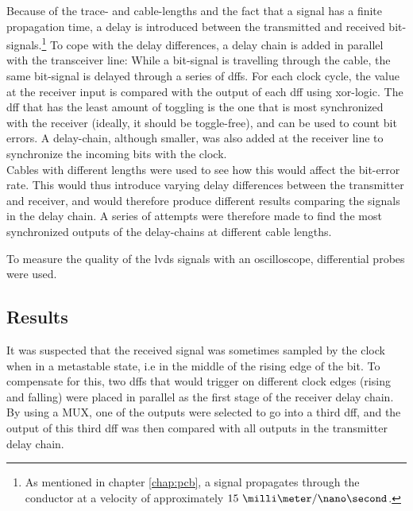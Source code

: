 \documentclass[main.tex]{subfiles}
\begin{document}
Because of the trace- and cable-lengths and the fact that a signal has a finite propagation time, a delay is introduced between the transmitted and received bit-signals.\footnote{As mentioned in chapter \ref{chap:pcb}, a signal propagates through the conductor at a velocity of approximately $15\ \milli\meter/\nano\second$.} To cope with the delay differences, a delay chain is added in parallel with the transceiver line: While a bit-signal is travelling through the cable, the same bit-signal is delayed through a series of \glspl{dff}. For each clock cycle, the value at the receiver input is compared with the output of each \gls{dff} using xor-logic. The \gls{dff} that has the least amount of toggling is the one that is most synchronized with the receiver (ideally, it should be toggle-free), and can be used to count bit errors. A delay-chain, although smaller, was also added at the receiver line to synchronize the incoming bits with the clock.
\\

Cables with different lengths were used to see how this would affect the bit-error rate. This would thus introduce varying delay differences between the transmitter and receiver, and would therefore produce different results comparing the signals in the delay chain. A series of attempts were therefore made to find the most synchronized outputs of the delay-chains at different cable lengths. 

To measure the quality of the \gls{lvds} signals with an oscilloscope, differential probes were used.  


\subsection{Results}


It was suspected that the received signal was sometimes sampled by the clock when in a metastable state, i.e in the middle of the rising edge of the bit. To compensate for this, two \glspl{dff} that would trigger on different clock edges (rising and falling) were placed in parallel as the first stage of the receiver delay chain. By using a MUX, one of the outputs were selected to go into a third \gls{dff}, and the output of this third \gls{dff} was then compared with all outputs in the transmitter delay chain. 
\end{document}

